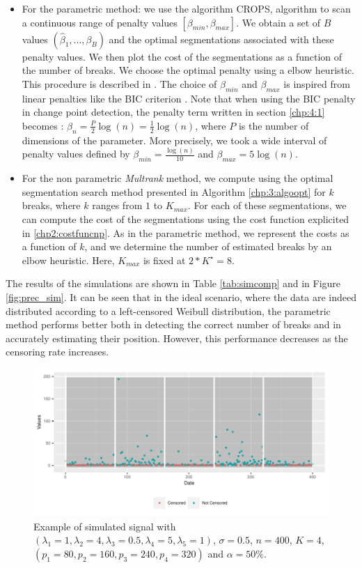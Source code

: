     \begin{itemize}
        \item For the parametric method: we use the algorithm CROPS, algorithm to scan a continuous range of penalty values $[\beta_{min},\beta_{max}]$. We obtain a set of $B$ values $(\hat \beta_1,...,\beta_B)$ and the optimal segmentations associated with these penalty values. We then plot the cost of the segmentations as a function of the number of breaks. We choose the optimal penalty using a elbow heuristic. This procedure is described in \cite{haynes2014}. The choice of $\beta_{min}$ and $\beta_{max}$ is inspired from linear penalties like the BIC criterion \cite{YAO1988181}. Note that when using the BIC penalty in change point detection, the penalty term written in section \ref{chp:4:1} becomes : $\beta_n = \frac{P}{2}\log(n) = \frac{1}{2}\log(n)$, where $P$ is the number of dimensions of the parameter. More precisely, we took a wide interval of penalty values defined by $\beta_{min} = \frac{\log(n)}{10}$ and $\beta_{max} = 5\log(n)$.
        \item For the non parametric \textit{Multrank} method, we compute using the optimal segmentation search method presented in Algorithm \ref{chp:3:algoopt} for $k$ breaks, where $k$ ranges from $1$ to $K_{max}$. For each of these segmentations, we can compute the cost of the segmentations using the cost function explicited in \ref{chp2:costfuncnp}. As in the parametric method, we represent the costs as a function of $k$, and we determine the number of estimated breaks by an elbow heuristic. Here, $K_{max}$ is fixed at $2*K^\star = 8$.
    \end{itemize}
The results of the simulations are shown in Table \ref{tab:simcomp} and in Figure \ref{fig:prec_sim}. It can be seen that in the ideal scenario, where the data are indeed distributed according to a left-censored Weibull distribution, the parametric method performs better both in detecting the correct number of breaks and in accurately estimating their position. However, this performance decreases as the censoring rate increases.

\begin{figure}[ht]
    \centering
    \includegraphics{figs/Chap4/Ex_sim.pdf}
    \caption{Example of simulated signal with $(\lambda_1 = 1, \lambda_2 = 4, \lambda_3 = 0.5, \lambda_4 = 5, \lambda_5 = 1)$, $\sigma = 0.5 $, $n = 400$, $K = 4$, $(p_1 = 80,p_2 = 160,p_3 = 240,p_4 = 320)$ and $\alpha = 50\%$.}
    \label{fig:ex_sim}
\end{figure}

